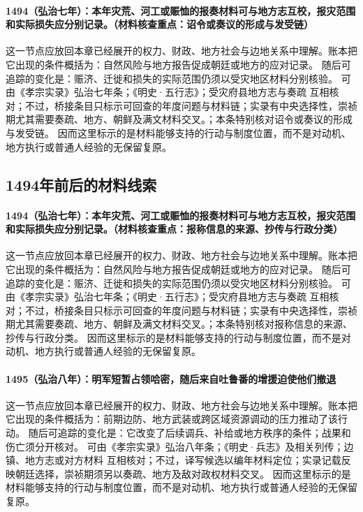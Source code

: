 \paragraph{1494（弘治七年）：本年灾荒、河工或赈恤的报奏材料可与地方志互校，报灾范围和实际损失应分别记录。（材料核查重点：诏令或奏议的形成与发受链）} 这一节点应放回本章已经展开的权力、财政、地方社会与边地关系中理解。账本把它出现的条件概括为：自然风险与地方报告促成朝廷或地方的应对记录。 随后可追踪的变化是：赈济、迁徙和损失的实际范围仍须以受灾地区材料分别核验。 可由《孝宗实录》弘治七年条；《明史·五行志》；受灾府县地方志与奏疏 互相核对；不过，桥接条目只标示可回查的年度问题与材料链；实录有中央选择性，崇祯期尤其需要奏疏、地方、朝鲜及满文材料交叉。；本条特别核对诏令或奏议的形成与发受链。 因而这里标示的是材料能够支持的行动与制度位置，而不是对动机、地方执行或普通人经验的无保留复原。

\subsection{1494年前后的材料线索}

\paragraph{1494（弘治七年）：本年灾荒、河工或赈恤的报奏材料可与地方志互校，报灾范围和实际损失应分别记录。（材料核查重点：报称信息的来源、抄传与行政分类）} 这一节点应放回本章已经展开的权力、财政、地方社会与边地关系中理解。账本把它出现的条件概括为：自然风险与地方报告促成朝廷或地方的应对记录。 随后可追踪的变化是：赈济、迁徙和损失的实际范围仍须以受灾地区材料分别核验。 可由《孝宗实录》弘治七年条；《明史·五行志》；受灾府县地方志与奏疏 互相核对；不过，桥接条目只标示可回查的年度问题与材料链；实录有中央选择性，崇祯期尤其需要奏疏、地方、朝鲜及满文材料交叉。；本条特别核对报称信息的来源、抄传与行政分类。 因而这里标示的是材料能够支持的行动与制度位置，而不是对动机、地方执行或普通人经验的无保留复原。

\paragraph{1495（弘治八年）：明军短暂占领哈密，随后来自吐鲁番的增援迫使他们撤退} 这一节点应放回本章已经展开的权力、财政、地方社会与边地关系中理解。账本把它出现的条件概括为：前期边防、地方武装或跨区域资源调动的压力推动了该行动。 随后可追踪的变化是：它改变了后续调兵、补给或地方秩序的条件；战果和伤亡须分开核对。 可由《孝宗实录》弘治八年条；《明史·兵志》及相关列传；边镇、地方志或对方材料 互相核对；不过，译写候选以编年材料定位；实录记载反映朝廷选择，崇祯期须另以奏疏、地方及敌对政权材料交叉。 因而这里标示的是材料能够支持的行动与制度位置，而不是对动机、地方执行或普通人经验的无保留复原。


